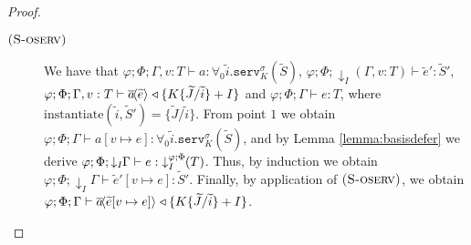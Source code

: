 \begin{lemma}[Substitution]
\begin{proof}
\begin{enumerate}
\begin{description}
\item[$\runa{S-oserv}$] We have that $\varphi;\Phi;\Gamma,v:T\vdash a : \forall_0\widetilde{i}.\texttt{serv}^\sigma_K(\widetilde{S})$, $\varphi;\Phi;\downarrow_I\!\!(\Gamma,v:T)\vdash \widetilde{e}' : \widetilde{S}'$, $\varphi;\Phi;\Gamma,v:T\vdash \asyncoutputch{a}{\widetilde{e}}{} \triangleleft \{K\{\widetilde{J}/\widetilde{i}\}+I\}$ and $\varphi;\Phi;\Gamma\vdash e : T$, where $\text{instantiate}(\widetilde{i},\widetilde{S}')=\{\widetilde{J}/\widetilde{i}\}$. From point $1$ we obtain $\varphi;\Phi;\Gamma\vdash a[v\mapsto e] : \forall_0\widetilde{i}.\texttt{serv}^\sigma_K(\widetilde{S})$, and by Lemma \ref{lemma:basisdefer} we derive $\varphi;\Phi;\downarrow_I\!\!\Gamma\vdash e :\; \susume{T}{\varphi}{\Phi}{I}$. Thus, by induction we obtain $\varphi;\Phi;\downarrow_I\!\!\Gamma\vdash \widetilde{e}'[v\mapsto e] : \widetilde{S}'$. Finally, by application of $\runa{S-oserv}$, we obtain $\varphi;\Phi;\Gamma\vdash \asyncoutputch{a}{\widetilde{e}[v\mapsto e]}{} \triangleleft \{K\{\widetilde{J}/\widetilde{i}\}+I\}$.
%
%
\end{description}
\end{enumerate}
\end{proof}
\end{lemma}


